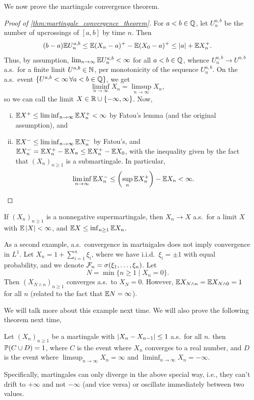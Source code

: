 We now prove the martingale convergence theorem.
\begin{proof}[Proof of \ref{thm:martingale_convergence_theorem}]
    For $a < b \in \mathbb Q$, let $U_n^{a, b}$ be the number of upcrossings of $[a, b]$ by time $n$. Then
    \[ (b - a) \mathbb E U_n^{a,b} \leq \mathbb E (X_n - a)^+ - \mathbb E(X_0 - a)^+ \leq \left\lvert a \right\rvert + \mathbb E X_n^+. \]
    Thus, by assumption, $\lim_{n \to \infty} \mathbb E U_n^{a,b} < \infty$ for all $a < b \in \mathbb Q$, whence $U_n^{a,b} \to U^{a,b}$ a.s.\ for a finite limit $U^{a,b} \in \mathbb N$, per monotonicity of the sequence $U_n^{a,b}$. On the a.s.\ event $\{U^{a,b} < \infty \, \forall a < b \in \mathbb Q\}$, we get
    \[ \liminf_{n \to \infty} X_n = \limsup_{n \to \infty} X_n, \]
    so we can call the limit $X \in \mathbb R \cup \{-\infty, \infty\}$. Now,

    \newpage
    \begin{enumerate}[(i)]
        \item $\mathbb E X^+ \leq \liminf_{n \to \infty} \mathbb E X_n^+ < \infty$ by Fatou's lemma (and the original assumption), and
        \item $\mathbb E X^- \leq \liminf_{n \to \infty} \mathbb E X_n^-$ by Fatou's, and $\mathbb E X_n^- = \mathbb E X_n^+ - \mathbb E X_n \leq \mathbb E X_n^+ - \mathbb E X_0$, with the inequality given by the fact that $(X_n)_{n \geq 1}$ is a submartingale. In particular,
        \[ \liminf_{n \to \infty} \mathbb E X_n^- \leq \left(\sup_n \mathbb E X_n^+\right) - \mathbb E X_n < \infty. \qedhere \]
    \end{enumerate}
\end{proof}

\begin{corollary} \label{cor:supermartingale_convergence}
    If $(X_n)_{n \geq 1}$ is a nonnegative supermartingale, then $X_n \to X$ a.s.\ for a limit $X$ with $\mathbb E \left\lvert X \right\rvert < \infty$, and $\mathbb E X \leq \inf_{n \geq 1} \mathbb E X_n$.
\end{corollary}

As a second example, a.s.\ convergence in martnigales does not imply convergence in $L^1$. Let $X_n = 1 + \sum_{i=1}^n \xi_i$, where we have i.i.d.\ $\xi_i = \pm 1$ with equal probability, and we denote $\mathcal F_n = \sigma(\xi_1, \dots, \xi_n)$. Let
\[ N = \min\{n \geq 1 \mid X_n = 0\}. \]
Then $(X_{N \wedge n})_{n \geq 1}$ converges a.s.\ to $X_N = 0$. However, $\mathbb E X_{N \wedge n} = \mathbb E X_{N \wedge 0} = 1$ for all $n$ (related to the fact that $\mathbb E N = \infty$).

We will talk more about this example next time. We will also prove the following theorem next time,
\begin{theorem*}
    Let $(X_n)_{n \geq 1}$ be a martingale with $\left\lvert X_n - X_{n-1} \right\rvert \leq 1$ a.s.\ for all $n$. then $\mathbb P(C \cup D) = 1$, where $C$ is the event where $X_n$ converges to a real number, and $D$ is the event where $\limsup_{n \to \infty} X_n = \infty$ and $\liminf_{n \to \infty} X_n = -\infty$.
\end{theorem*}
Specifically, martingales can only diverge in the above special way, i.e., they can't drift to $+\infty$ and not $-\infty$ (and vice versa) or oscillate immediately between two values.